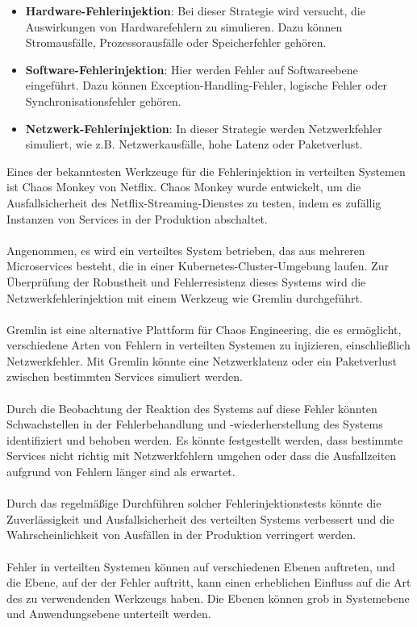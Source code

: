 \documentclass[../vs-script-first-v01.tex]{subfiles}
\begin{document}
\begin{itemize}
\item \textbf{Hardware-Fehlerinjektion}: Bei dieser Strategie wird versucht, die Auswirkungen von Hardwarefehlern zu simulieren. Dazu können Stromausfälle, Prozessorausfälle oder Speicherfehler gehören.
\item \textbf{Software-Fehlerinjektion}: Hier werden Fehler auf Softwareebene eingeführt. Dazu können Exception-Handling-Fehler, logische Fehler oder Synchronisationsfehler gehören.
\item \textbf{Netzwerk-Fehlerinjektion}: In dieser Strategie werden Netzwerkfehler simuliert, wie z.B. Netzwerkausfälle, hohe Latenz oder Paketverlust.
\end{itemize}
Eines der bekanntesten Werkzeuge für die Fehlerinjektion in verteilten Systemen ist Chaos Monkey von Netflix. Chaos Monkey wurde entwickelt, um die Ausfallsicherheit des Netflix-Streaming-Dienstes zu testen, indem es zufällig Instanzen von Services in der Produktion abschaltet.
\\\\
Angenommen, es wird ein verteiltes System betrieben, das aus mehreren Microservices besteht, die in einer Kubernetes-Cluster-Umgebung laufen. Zur Überprüfung der Robustheit und Fehlerresistenz dieses Systems wird die Netzwerkfehlerinjektion mit einem Werkzeug wie Gremlin durchgeführt.
\\\\
Gremlin ist eine alternative Plattform für Chaos Engineering, die es ermöglicht, verschiedene Arten von Fehlern in verteilten Systemen zu injizieren, einschließlich Netzwerkfehler. Mit Gremlin könnte eine Netzwerklatenz oder ein Paketverlust zwischen bestimmten Services simuliert werden.
\\\\
Durch die Beobachtung der Reaktion des Systems auf diese Fehler könnten Schwachstellen in der Fehlerbehandlung und -wiederherstellung des Systems identifiziert und behoben werden. Es könnte festgestellt werden, dass bestimmte Services nicht richtig mit Netzwerkfehlern umgehen oder dass die Ausfallzeiten aufgrund von Fehlern länger sind als erwartet.
\\\\
Durch das regelmäßige Durchführen solcher Fehlerinjektionstests könnte die Zuverlässigkeit und Ausfallsicherheit des verteilten Systems verbessert und die Wahrscheinlichkeit von Ausfällen in der Produktion verringert werden.
\\\\
Fehler in verteilten Systemen können auf verschiedenen Ebenen auftreten, und die Ebene, auf der der Fehler auftritt, kann einen erheblichen Einfluss auf die Art des zu verwendenden Werkzeugs haben. Die Ebenen können grob in Systemebene und Anwendungsebene unterteilt werden.
\end{document}
